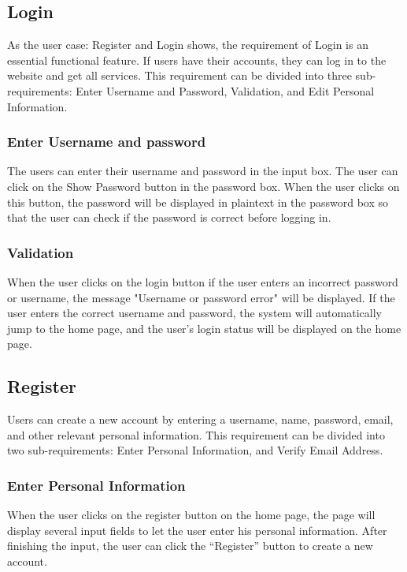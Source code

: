 \documentclass[conference]{IEEEtran}
\begin{document}
\subsection{ Login}

As the user case: Register and Login shows, the requirement of Login is an essential functional feature. If users have their accounts, they can log in to the website and get all services. This requirement can be divided into three sub-requirements: 
Enter Username and Password, Validation, and Edit Personal Information.

\subsubsection{ Enter Username and password}

The users can enter their username and password in the input box. The 
user can click on the Show Password button in the password box. When the user 
clicks on this button, the password will be displayed in plaintext in the password 
box so that the user can check if the password is correct before logging in.

\subsubsection{ Validation }

When the user clicks on the login button if the user enters an incorrect 
password or username, the message "Username or password error" will be 
displayed. If the user enters the correct username and password, the system 
will automatically jump to the home page, and the user's login status will be 
displayed on the home page.


\subsection{  Register}

Users can create a new account by entering a username, name, password, email,
and other relevant personal information. This requirement can be divided into 
two sub-requirements: Enter Personal Information, and Verify Email Address.

\subsubsection{ Enter Personal Information}

When the user clicks on the register button on the home page, the page will display several 
input fields to let the user enter his personal information. After finishing the 
input, the user can click the “Register” button to create a new account.
\end{document}
